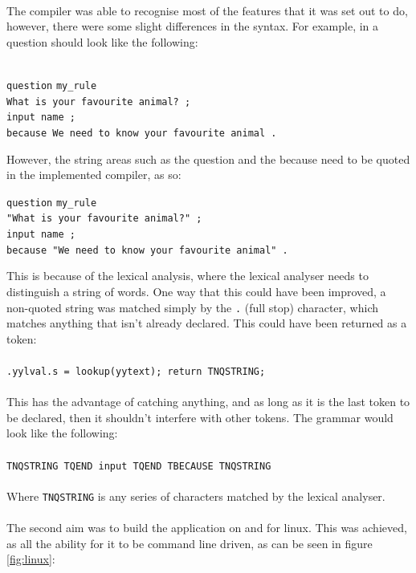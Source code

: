 \documentclass[12pt]{report}
\begin{document}
\\
The compiler was able to recognise most of the features that it was set out to do, however, there were some slight differences in the syntax.  For example, in a question should look like the following:\\
\\
\begin{tabbing}
\texttt{question} \= \texttt{my\_rule}\\
\> \texttt{What is your favourite animal? ;}\\
\> \texttt{input name ;}\\
\> \texttt{because We need to know your favourite animal .}\\
\end{tabbing}
However, the string areas such as the question and the because need to be quoted in the implemented compiler, as so:\\
\begin{tabbing}
\texttt{question} \= \texttt{my\_rule}\\
\> \texttt{"What is your favourite animal?" ;}\\
\> \texttt{input name ;}\\
\> \texttt{because "We need to know your favourite animal" .}\\
\end{tabbing}
This is because of the lexical analysis, where the lexical analyser needs to distinguish a string of words.  One way that this could have been improved, a non-quoted string was matched simply by the \texttt{.} (full stop) character, which matches anything that isn't already declared.  This could have been returned as a token:\\
\\
\texttt{.\quad\quad\quad yylval.s = lookup(yytext); return TNQSTRING;}\\
\\
This has the advantage of catching anything, and as long as it is the last token to be declared, then it shouldn't interfere with other tokens.  The grammar would look like the following:\\
\\
\texttt{TNQSTRING TQEND input TQEND TBECAUSE TNQSTRING}\\
\\
Where \texttt{TNQSTRING} is any series of characters matched by the lexical analyser.\\
\\
The second aim was to build the application on and for linux.  This was achieved, as all the ability for it to be command line driven, as can be seen in figure \ref{fig:linux}:
\end{document}

